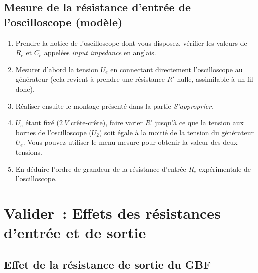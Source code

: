 \documentclass[a4paper, 11pt, final, garamond]{book}
\begin{document}
\vspace{-0.6cm}

\subsection{Mesure de la résistance d'entrée de l'oscilloscope (modèle)}

\begin{enumerate}
    \item Prendre la notice de l'oscilloscope dont vous disposez, vérifier les
        valeurs de $R_{e}$ et $C_{e}$ appelées \textit{input impedance} en
        anglais.
    \item Mesurer d'abord la tension $U_{e}$ en connectant directement
        l'oscilloscope au générateur (cela revient à prendre une résistance $R'$
        nulle, assimilable à un fil donc).
    \item Réaliser ensuite le montage présenté dans la partie
        \textit{S'approprier}.
    \item $U_{e}$ étant fixé ($\SI{2}{V}$ crête-crête), faire varier $R'$
        jusqu'à ce que la tension aux bornes de l'oscilloscope ($U_2$) soit
        égale à la moitié de la tension du générateur $U_{e}$. Vous pouvez
        utiliser le menu mesure pour obtenir la valeur des deux tensions.
    \item En déduire l'ordre de grandeur de la résistance d'entrée $R_{e}$
        expérimentale de l'oscilloscope.
\end{enumerate}

\section{Valider~: Effets des résistances d'entrée et de sortie}
\subsection{Effet de la résistance de sortie du GBF}
\end{document}
